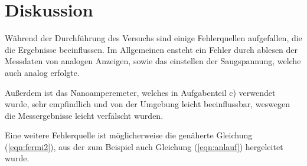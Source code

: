 \section{Diskussion}
Während der Durchführung des Versuchs sind einige Fehlerquellen aufgefallen, die die Ergebnisse beeinflussen.
Im Allgemeinen ensteht ein Fehler durch ablesen der Messdaten von analogen Anzeigen, 
sowie das einstellen der Saugspannung, welche auch analog erfolgte.

\noindent
Außerdem ist das Nanoamperemeter, welches in Aufgabenteil c) verwendet wurde, sehr empfindlich und von der Umgebung leicht beeinflussbar,
weswegen die Messergebnisse leicht verfälscht wurden.

\noindent
Eine weitere Fehlerquelle ist möglicherweise die genäherte Gleichung (\ref{eqn:fermi2}), aus der zum Beispiel auch Gleichung (\ref{eqn:anlauf}) hergeleitet wurde.
